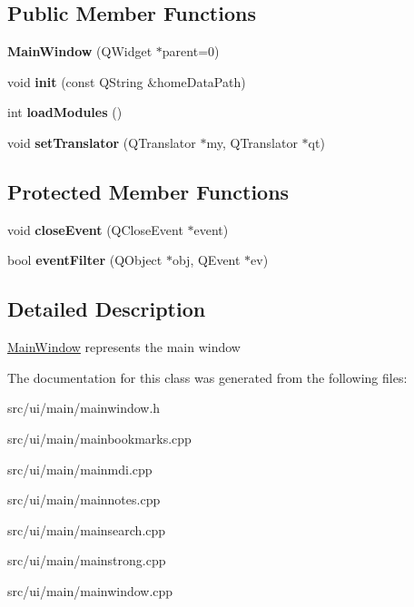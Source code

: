 \subsection*{Public Member Functions}
\begin{CompactItemize}
\item 
\hypertarget{classMainWindow_8b244be8b7b7db1b08de2a2acb9409db}{
\textbf{MainWindow} (QWidget $\ast$parent=0)}
\label{classMainWindow_8b244be8b7b7db1b08de2a2acb9409db}

\item 
\hypertarget{classMainWindow_1f508b9d9a5a263923fb3cc8fc9972b7}{
void \textbf{init} (const QString \&homeDataPath)}
\label{classMainWindow_1f508b9d9a5a263923fb3cc8fc9972b7}

\item 
\hypertarget{classMainWindow_89e1553480a2a324bfdf0a3fc0ed8645}{
int \textbf{loadModules} ()}
\label{classMainWindow_89e1553480a2a324bfdf0a3fc0ed8645}

\item 
\hypertarget{classMainWindow_36c558b2a34c0bb56ae8a60c5bcfdff0}{
void \textbf{setTranslator} (QTranslator $\ast$my, QTranslator $\ast$qt)}
\label{classMainWindow_36c558b2a34c0bb56ae8a60c5bcfdff0}

\end{CompactItemize}
\subsection*{Protected Member Functions}
\begin{CompactItemize}
\item 
\hypertarget{classMainWindow_4e20a4a065fbb0e4d3532a45a0a91425}{
void \textbf{closeEvent} (QCloseEvent $\ast$event)}
\label{classMainWindow_4e20a4a065fbb0e4d3532a45a0a91425}

\item 
\hypertarget{classMainWindow_53b218282f3d113b2aec441a3313f472}{
bool \textbf{eventFilter} (QObject $\ast$obj, QEvent $\ast$ev)}
\label{classMainWindow_53b218282f3d113b2aec441a3313f472}

\end{CompactItemize}


\subsection{Detailed Description}
\hyperlink{classMainWindow}{MainWindow} represents the main window 

The documentation for this class was generated from the following files:\begin{CompactItemize}
\item 
src/ui/main/mainwindow.h\item 
src/ui/main/mainbookmarks.cpp\item 
src/ui/main/mainmdi.cpp\item 
src/ui/main/mainnotes.cpp\item 
src/ui/main/mainsearch.cpp\item 
src/ui/main/mainstrong.cpp\item 
src/ui/main/mainwindow.cpp\end{CompactItemize}
